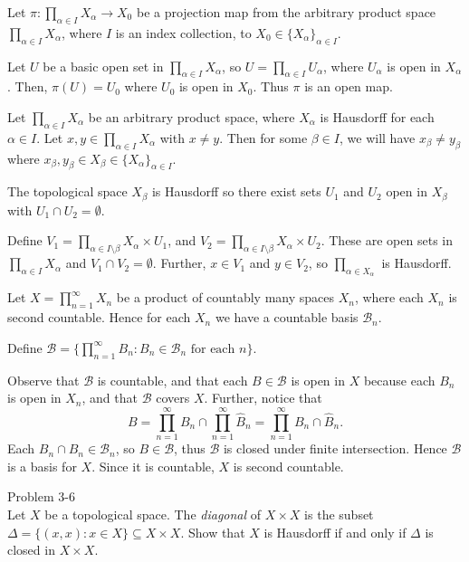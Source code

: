 \documentclass{homework651}
\newcommand\nextprob{\newpage}
\newcommand\ra{\rightarrow}
\newcommand\calB{\mathcal{B}}
\begin{document}
\begin{aproblems}
\vspace{.3in}

\subsol
Let $\pi: \prod_{\alpha\in I} X_\alpha \ra X_0$ be a projection map from
the arbitrary product space $\prod_{\alpha\in I} X_\alpha$, where $I$ is an index
collection, to $X_0\in\{X_\alpha\}_{\alpha\in I}$.

Let $U$ be a basic open set in $\prod_{\alpha\in I} X_\alpha$,
so $U=\prod_{\alpha\in I} U_\alpha$,
where $U_\alpha$ is open in $X_\alpha$.  Then, $\pi(U)=U_0$ where $U_0$
is open in $X_0$.  Thus $\pi$ is an open map.

\newpage

\subsol
Let $\prod_{\alpha\in I} X_\alpha$ be an arbitrary product space,
where $X_\alpha$ is
Hausdorff for each $\alpha\in I$.  Let $x,y\in\prod_{\alpha\in I} X_\alpha$
with $x\ne y$.
Then for some $\beta\in I$, we will have $x_\beta\ne y_\beta$ where
$x_\beta,y_\beta\in X_\beta\in\{X_\alpha\}_{\alpha\in I}$.

The topological space $X_\beta$ is Hausdorff so there exist sets $U_1$ and
$U_2$ open in $X_\beta$ with $U_1\cap U_2=\emptyset$.

Define $V_1=\prod_{\alpha\in I\setminus\beta} X_\alpha \times U_1$, and
$V_2=\prod_{\alpha\in I\setminus\beta} X_\alpha \times U_2$.  These are open sets
in $\prod_{\alpha\in I} X_\alpha$ and $V_1\cap V_2=\emptyset$.  Further,
$x\in V_1$ and $y\in V_2$, so $\prod_{\alpha\in X_\alpha}$ is Hausdorff.

\vspace{.3in}

\subsol
Let $X=\prod_{n=1}^{\infty} X_n$ be a product of countably many spaces
$X_n$, where each $X_n$ is second countable.  Hence for each $X_n$ we have
a countable basis $\calB_n$.

Define $\calB=\{\prod_{n=1}^{\infty} B_n : B_n\in\calB_n \text{ for each } n\}$.

Observe that $\calB$ is countable, and that each $B\in\calB$ is open in $X$
because each $B_n$ is open in $X_n$, and that $\calB$ covers $X$.
Further, notice that
$$ B=\prod_{n=1}^{\infty} B_n \cap \prod_{n=1}^{\infty} \hat B_n =
\prod_{n=1}^{\infty} B_n\cap \hat B_n. $$
Each $B_n\cap\hat B_n\in\calB_n$, so $B\in\calB$, thus $\calB$ is
closed under finite intersection.  Hence $\calB$ is a basis for $X$.  Since
it is countable, $X$ is second countable.

\nextprob
\hproblem Problem 3-6\\
Let $X$ be a topological space.  The \emph{diagonal} of $X\times X$ is the subset
$\Delta=\{(x,x):x\in X\}\subseteq X\times X$.  Show that $X$ is Hausdorff
if and only if $\Delta$ is closed in $X\times X$.


\end{aproblems}
\end{document}
